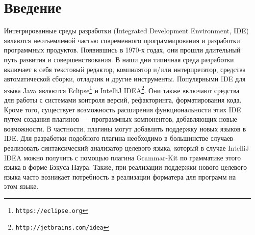 \section*{Введение}
\lstset{basicstyle=\normalsize\ttfamily, columns=fullflexible}

Интегрированные среды разработки (Integrated Development Environment, IDE) являются неотъемлемой частью современного программирования и разработки программных продуктов. 
Появившись в 1970-х годах, они прошли длительный путь развития и совершенствования. 
В наши дни типичная среда разработки включает в себя текстовый редактор, компилятор и/или интерпретатор, средства автоматической сборки, отладчик и другие инструменты. 
Популярными IDE для языка Java являются Eclipse\footnote{\texttt{https://eclipse.org}} и IntelliJ IDEA\footnote{\texttt{http://jetbrains.com/idea}}.
Они также включают средства для работы с системами контроля версий, рефакторинга, форматирования кода. 
Кроме того, существует возможность расширения функциональности этих IDE путем создания плагинов~--- программных компонентов, добавляющих новые возможности.
В частности, плагины могут добавлять поддержку новых языков в IDE.
Для разработки подобного плагина необходимо в большинстве случаев реализовать синтаксический анализатор целевого языка, который в случае IntelliJ IDEA можно получить с помощью плагина Grammar-Kit по грамматике этого языка в форме Бэкуса-Наура.
Также, при реализации поддержки нового целевого языка часто возникает потребность в реализации форматера для программ на этом языке.

